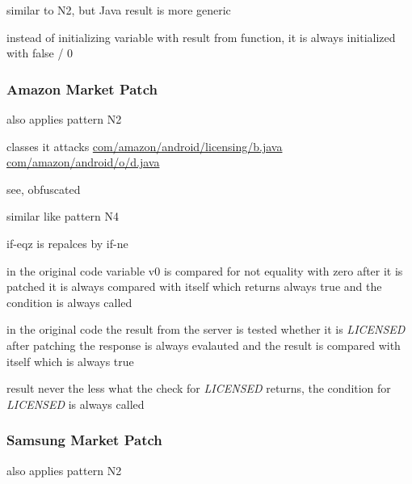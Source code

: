 similar to N2, but Java result is more generic



instead of initializing variable with result from function, it is always initialized with false / 0
\subsubsection{Amazon Market Patch}
also applies pattern N2

classes it attacks %
\url{com/amazon/android/licensing/b.java}
\url{com/amazon/android/o/d.java}

see, obfuscated

similar like pattern N4



if-eqz is repalces by if-ne


in the original code variable v0 is compared for not equality with zero
after it is patched it is always compared with itself which returns always true and the condition is always called



in the original code the result from the server is tested whether it is \textit{LICENSED}
after patching the response is always evalauted and the result is compared with itself which is always true

result
never the less what the check for \textit{LICENSED} returns, the condition for \textit{LICENSED} is always called
\subsubsection{Samsung Market Patch}
also applies pattern N2

